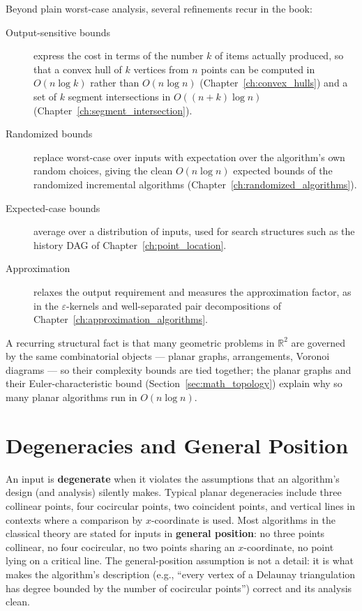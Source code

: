 Beyond plain worst-case analysis, several refinements recur in the book:
\begin{description}
  \item[Output-sensitive bounds] express the cost in terms of the number
    $k$ of items actually produced, so that a convex hull of $k$ vertices
    from $n$ points can be computed in $O(n \log k)$ rather than
    $O(n \log n)$ (Chapter~\ref{ch:convex_hulls}) and a set of $k$ segment
    intersections in $O((n+k)\log n)$ (Chapter~\ref{ch:segment_intersection}).
  \item[Randomized bounds] replace worst-case over inputs with expectation
    over the algorithm's own random choices, giving the clean $O(n \log n)$
    expected bounds of the randomized incremental algorithms
    (Chapter~\ref{ch:randomized_algorithms}).
  \item[Expected-case bounds] average over a distribution of inputs, used
    for search structures such as the history DAG of
    Chapter~\ref{ch:point_location}.
  \item[Approximation] relaxes the output requirement and measures the
    approximation factor, as in the $\varepsilon$-kernels and
    well-separated pair decompositions of Chapter~\ref{ch:approximation_algorithms}.
\end{description}

A recurring structural fact is that many geometric problems in
$\mathbb{R}^2$ are governed by the same combinatorial objects --- planar
graphs, arrangements, Voronoi diagrams --- so their complexity bounds are
tied together; the planar graphs and their Euler-characteristic bound
(Section~\ref{sec:math_topology}) explain why so many planar algorithms
run in $O(n \log n)$.


\section{Degeneracies and General Position}
\label{sec:intro_degeneracies}

An input is \textbf{degenerate} when it violates the assumptions that an
algorithm's design (and analysis) silently makes. Typical planar
degeneracies include three collinear points, four cocircular points, two
coincident points, and vertical lines in contexts where a comparison by
$x$-coordinate is used. Most algorithms in the classical theory are stated
for inputs in \textbf{general position}: no three points collinear, no four
cocircular, no two points sharing an $x$-coordinate, no point lying on a
critical line. The general-position assumption is not a detail: it is what
makes the algorithm's description (e.g., ``every vertex of a Delaunay
triangulation has degree bounded by the number of cocircular points'')
correct and its analysis clean.

